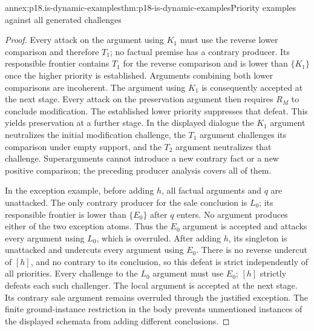 \begin{annexitem}{annex:p18.is-dynamic-examples}{thm:p18-is-dynamic-examples}{Priority examples against all generated challenges}
\begin{proof}
Every attack on the argument using \(K_1\) must use the reverse
lower comparison and therefore \(T_1\); no factual premise has
a contrary producer. Its responsible frontier contains \(T_1\)
for the reverse comparison and is lower than \(\{K_1\}\)
once the higher priority is established.
Arguments combining both lower comparisons are incoherent.
The argument using \(K_1\) is consequently accepted at the next
stage. Every attack on the preservation argument then requires
\(R_M\) to conclude modification. The established lower priority
suppresses that defeat. This yields preservation at a further
stage. In the displayed dialogue the \(K_1\) argument neutralizes
the initial modification challenge, the \(T_1\) argument challenges
its comparison under empty support, and the \(T_2\) argument
neutralizes that challenge. Superarguments cannot introduce a
new contrary fact or a new positive comparison; the preceding
producer analysis covers all of them.

In the exception example, before adding \(h\), all factual
arguments and \(q\) are unattacked. The only contrary producer
for the sale conclusion is \(L_0\); its responsible frontier
is lower than \(\{E_0\}\) after \(q\) enters.
No argument produces either of the two exception atoms.
Thus the \(E_0\) argument is accepted and attacks every
argument using \(L_0\), which is overruled.
After adding \(h\), its singleton is unattacked and undercuts
every argument using \(E_0\). There is no reverse undercut of
\([h]\), and no contrary to its conclusion, so this defeat is
strict independently of all priorities.
Every challenge to the \(L_0\) argument must use \(E_0\);
\([h]\) strictly defeats each such challenger. The local
argument is accepted at the next stage. Its contrary sale
argument remains overruled through the justified exception.
The finite ground-instance restriction in the body prevents
unmentioned instances of the displayed schemata from adding
different conclusions.
\end{proof}
\end{annexitem}

